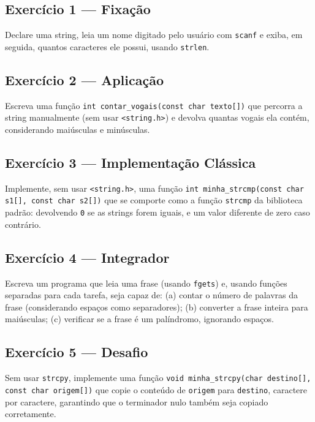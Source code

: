 \begin{exercicio}

\subsection*{Exercício 1 --- Fixação}
Declare uma string, leia um nome digitado pelo usuário com \texttt{scanf} e exiba, em seguida, quantos caracteres ele possui, usando \texttt{strlen}.

\subsection*{Exercício 2 --- Aplicação}
Escreva uma função \texttt{int contar\_vogais(const char texto[])} que percorra a string manualmente (sem usar \texttt{<string.h>}) e devolva quantas vogais ela contém, considerando maiúsculas e minúsculas.

\subsection*{Exercício 3 --- Implementação Clássica}
Implemente, sem usar \texttt{<string.h>}, uma função \texttt{int minha\_strcmp(const char s1[], const char s2[])} que se comporte como a função \texttt{strcmp} da biblioteca padrão: devolvendo \texttt{0} se as strings forem iguais, e um valor diferente de zero caso contrário.

\subsection*{Exercício 4 --- Integrador}
Escreva um programa que leia uma frase (usando \texttt{fgets}) e, usando funções separadas para cada tarefa, seja capaz de: (a) contar o número de palavras da frase (considerando espaços como separadores); (b) converter a frase inteira para maiúsculas; (c) verificar se a frase é um palíndromo, ignorando espaços.

\subsection*{Exercício 5 --- Desafio}
Sem usar \texttt{strcpy}, implemente uma função \texttt{void minha\_strcpy(char destino[], const char origem[])} que copie o conteúdo de \texttt{origem} para \texttt{destino}, caractere por caractere, garantindo que o terminador nulo também seja copiado corretamente.

\end{exercicio}
